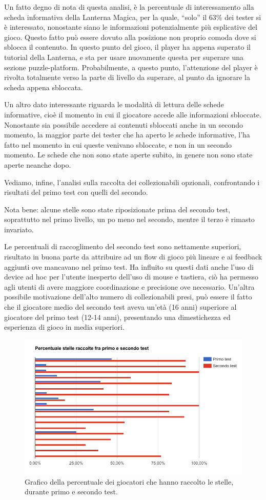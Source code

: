 Un fatto degno di nota di questa analisi, è la percentuale di interessamento alla scheda informativa della Lanterna Magica, per la quale, ``solo'' il 63\% dei tester si è interessato, nonostante siano le informazioni potenzialmente più esplicative del gioco. Questo fatto può essere dovuto alla posizione non proprio comoda dove si sblocca il contenuto. In questo punto del gioco, il player ha appena superato il tutorial della Lanterna, e sta per usare nuovamente questa per superare una sezione puzzle-platform. Probabilmente, a questo punto, l'attenzione del player è rivolta totalmente verso la parte di livello da superare, al punto da ignorare la scheda appena sbloccata.

Un altro dato interessante riguarda le modalità di lettura delle schede informative, cioè il momento in cui il giocatore accede alle informazioni sbloccate. Nonostante sia possibile accedere ai contenuti sbloccati anche in un secondo momento, la maggior parte dei tester che ha aperto le schede informative, l'ha fatto nel momento in cui queste venivano sbloccate, e non in un secondo momento. Le schede che non sono state aperte subito, in genere non sono state aperte neanche dopo.

Vediamo, infine, l'analisi sulla raccolta dei collezionabili opzionali, confrontando i risultati del primo test con quelli del secondo.

Nota bene: alcune stelle sono state riposizionate prima del secondo test, soprattutto nel primo livello, un po meno nel secondo, mentre il terzo è rimasto invariato.

Le percentuali di raccoglimento del secondo test sono nettamente superiori, risultato in buona parte da attribuire ad un flow di gioco più lineare e ai feedback aggiunti ove mancavano nel primo test. Ha influito su questi dati anche l'uso di device ad hoc per l'utente inesperto dell'uso di mouse e tastiera, ciò ha permesso agli utenti di avere maggiore coordinazione e precisione ove necessario. Un'altra possibile motivazione dell'alto numero di collezionabili presi, può essere il fatto che il giocatore medio del secondo test aveva un'età (16 anni) superiore al giocatore del primo test (12-14 anni), presentando una dimestichezza ed esperienza di gioco in media superiori.

\begin{figure}[h]
\centerline{\includegraphics[scale=0.6]{images/risultati/test-stelle.png}}
\caption{Grafico della percentuale dei giocatori che hanno raccolto le stelle, durante primo e secondo test.}
\label{fig:test-stelle}
\end{figure}

\newpage